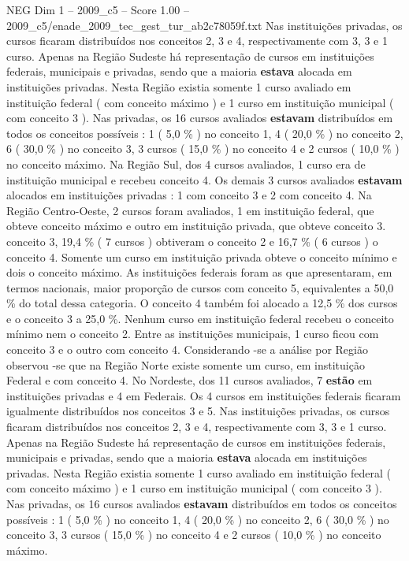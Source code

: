 \begin{textsample}{NEG Dim 1 – 2009\_c5 – Score 1.00 – 2009\_c5/enade\_2009\_tec\_gest\_tur\_ab2c78059f.txt}
Nas instituições privadas, os cursos ficaram distribuídos nos conceitos 2, 3 e 4, respectivamente com 3, 3 e 1 curso.
Apenas na Região Sudeste há representação de cursos em instituições federais, municipais e privadas, sendo que a maioria \textbf{estava} alocada em instituições privadas.
Nesta Região existia somente 1 curso avaliado em instituição federal ( com conceito máximo ) e 1 curso em instituição municipal ( com conceito 3 ).
Nas privadas, os 16 cursos avaliados \textbf{estavam} distribuídos em todos os conceitos possíveis : 1 ( 5,0 \% ) no conceito 1, 4 ( 20,0 \% ) no conceito 2, 6 ( 30,0 \% ) no conceito 3, 3 cursos ( 15,0 \% ) no conceito 4 e 2 cursos ( 10,0 \% ) no conceito máximo.
Na Região Sul, dos 4 cursos avaliados, 1 curso era de instituição municipal e recebeu conceito 4.
Os demais 3 cursos avaliados \textbf{estavam} alocados em instituições privadas : 1 com conceito 3 e 2 com conceito 4.
Na Região Centro-Oeste, 2 cursos foram avaliados, 1 em instituição federal, que obteve conceito máximo e outro em instituição privada, que obteve conceito 3. conceito 3, 19,4 \% ( 7 cursos ) obtiveram o conceito 2 e 16,7 \% ( 6 cursos ) o conceito 4.
Somente um curso em instituição privada obteve o conceito mínimo e dois o conceito máximo.
As instituições federais foram as que apresentaram, em termos nacionais, maior proporção de cursos com conceito 5, equivalentes a 50,0 \% do total dessa categoria.
O conceito 4 também foi alocado a 12,5 \% dos cursos e o conceito 3 a 25,0 \%.
Nenhum curso em instituição federal recebeu o conceito mínimo nem o conceito 2.
Entre as instituições municipais, 1 curso ficou com conceito 3 e o outro com conceito 4.
Considerando -se a análise por Região observou -se que na Região Norte existe somente um curso, em instituição Federal e com conceito 4.
No Nordeste, dos 11 cursos avaliados, 7 \textbf{estão} em instituições privadas e 4 em Federais.
Os 4 cursos em instituições federais ficaram igualmente distribuídos nos conceitos 3 e 5.
Nas instituições privadas, os cursos ficaram distribuídos nos conceitos 2, 3 e 4, respectivamente com 3, 3 e 1 curso.
Apenas na Região Sudeste há representação de cursos em instituições federais, municipais e privadas, sendo que a maioria \textbf{estava} alocada em instituições privadas.
Nesta Região existia somente 1 curso avaliado em instituição federal ( com conceito máximo ) e 1 curso em instituição municipal ( com conceito 3 ).
Nas privadas, os 16 cursos avaliados \textbf{estavam} distribuídos em todos os conceitos possíveis : 1 ( 5,0 \% ) no conceito 1, 4 ( 20,0 \% ) no conceito 2, 6 ( 30,0 \% ) no conceito 3, 3 cursos ( 15,0 \% ) no conceito 4 e 2 cursos ( 10,0 \% ) no conceito máximo.

\end{textsample}
